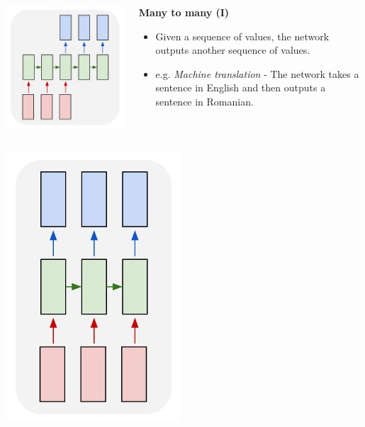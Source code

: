 \documentclass{beamer}
\begin{document}
\begin{frame}[allowframebreaks]
\begin{columns}
\begin{column}{0.5\textwidth}
      \includegraphics[height=0.7\textheight]{../img/rnn-many-to-many-1.png}
    \end{column}
    \begin{column}{0.5\textwidth}
      \begin{center}
        \textbf{Many to many (I)}
      \end{center}
      \begin{itemize}
        \item Given a sequence of values, the network outputs another sequence of values.
        \item e.g. \textit{Machine translation} - The network takes a sentence in English and then outputs a sentence in Romanian.
      \end{itemize}
    \end{column}
  \end{columns}
  \framebreak
  \begin{columns}
    \begin{column}{0.3\textwidth}
      \includegraphics[height=0.7\textheight]{../img/rnn-many-to-many-2.png}

\end{column}
\end{columns}
\end{frame}
\end{document}
